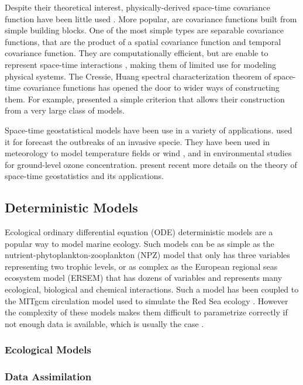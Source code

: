 Despite their theoretical interest, physically-derived space-time covariance function have been little used \cite{Gneiting2010}. More popular, are covariance functions built from simple building blocks. One of the most simple types are separable covariance functions, that are the product of a spatial covariance function and temporal covariance function. They are computationally efficient, but are enable to represent space-time interactions \cite{Cressie1999, Stein2005}, making them of limited use for modeling physical systems. The Cressie, Huang spectral characterization theorem of space-time covariance functions has opened the door to wider ways of constructing them. For example, \cite{Gneiting2002} presented a simple criterion that allows their construction from a very large class of models. 

Space-time geostatistical models have been use in a variety of applications. \cite{Hohn1993} used it for forecast the outbreaks of an invasive specie. They have been used in meteorology to model temperature fields \cite{Handcock1994, North2011} or wind \cite{Cressie1999, Gneiting2002}, and in environmental studies for ground-level ozone concentration. \cite{Gneiting2007, Gneiting2010} present recent more details on the theory of space-time geostatistics and its applications.  

\subsection{Deterministic Models}
Ecological ordinary differential equation (ODE) deterministic models are a popular way to model marine ecology. Such models can be as simple as the nutrient-phytoplankton-zooplankton (NPZ) model that only has three variables representing two trophic levels, or as complex as the European regional seas ecosystem model (ERSEM) that has dozens of variables and represents many ecological, biological and chemical interactions. Such a model has been coupled to the MITgcm circulation model used to simulate the Red Sea ecology \cite{Triantafyllou2014}. However the complexity of these models makes them difficult to parametrize correctly if not enough data is available, which is usually the case \cite{Anderson2005}.

\subsubsection{Ecological Models}
\subsubsection{Data Assimilation}

